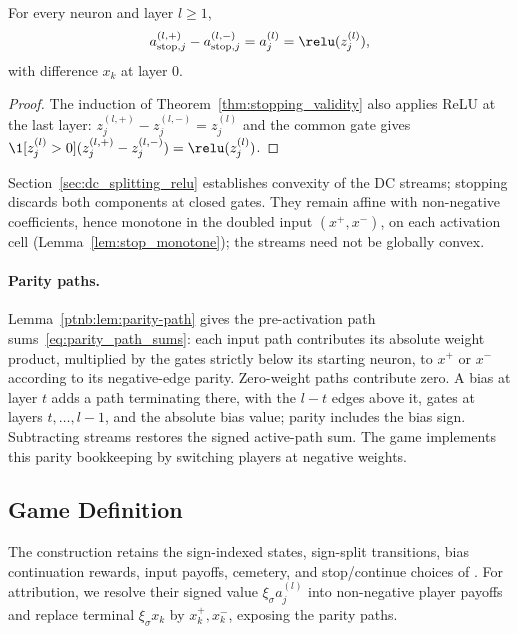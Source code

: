 \begin{theoremenv}\label{ptnb:thm:decomp-recovery}
For every neuron and layer $l\geq1$,
\begin{equation}\label{ptnb:eq:decomp-recovery-stop-mix}
    a_{\mathrm{stop},j}^{(l,+)}-a_{\mathrm{stop},j}^{(l,-)}=a_j^{(l)}=\relu(z_j^{(l)}),
\end{equation}
with difference $x_k$ at layer $0$.
\end{theoremenv}
\begin{proof}
The induction of Theorem~\ref{thm:stopping_validity} also applies ReLU at the last layer:
$z_j^{(l,+)}-z_j^{(l,-)}=z_j^{(l)}$ and the common gate gives
$\1[z_j^{(l)}>0](z_j^{(l,+)}-z_j^{(l,-)})=\relu(z_j^{(l)})$.
\end{proof}

Section~\ref{sec:dc_splitting_relu} establishes convexity of the DC streams; stopping discards
both components at closed gates. They remain affine with non-negative
coefficients, hence monotone in the doubled input $(x^+,x^-)$, on each activation cell
(Lemma~\ref{lem:stop_monotone}); the streams need not be globally convex.

\paragraph{Parity paths.}\label{ptnb:app:parity-path}
Lemma~\ref{ptnb:lem:parity-path} gives the pre-activation path sums~\eqref{eq:parity_path_sums}: each input path
contributes its absolute weight product, multiplied by the gates strictly below its starting
neuron, to $x^+$ or $x^-$ according to its negative-edge parity. Zero-weight paths contribute zero.
A bias at layer $t$ adds a path terminating there, with the $l-t$ edges above it, gates at
layers $t,\dots,l-1$, and the absolute bias value; parity includes the bias sign. Subtracting streams restores the signed active-path
sum. The game implements this parity bookkeeping by switching players at negative weights.

\subsection{Game Definition}\label{ptnb:app:adf-game-def}\label{sec:shapley_bellman_recursion}\label{ptnb:app:adf-recursion}

The construction retains the sign-indexed states, sign-split transitions, bias continuation rewards,
input payoffs, cemetery, and stop/continue choices of \textcite{Gaubert2025}. For attribution, we
resolve their signed value $\xi_\sigma a_j^{(l)}$ into non-negative player payoffs and replace terminal
$\xi_\sigma x_k$ by $x_k^+,x_k^-$, exposing the parity paths.

